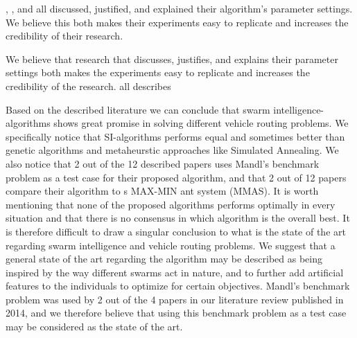 \citet{sedighpour14}, \citet{poorzahedy11}, and \citet{kechagiopoulos14} all discussed, justified, and explained their algorithm's parameter settings. We believe this both makes their experiments easy to replicate and increases the credibility of their research.

 We believe that research that discusses, justifies, and explains their parameter settings both makes the experiments easy to replicate and increases the credibility of the research. all describes



Based on the described literature we can conclude that swarm intelligence-algorithms shows great promise in solving different vehicle routing problems. We specifically notice that SI-algorithms performs equal and sometimes better than genetic algorithms and  metaheurstic approaches like Simulated Annealing. We also notice that 2 out of the 12 described papers uses Mandl's benchmark problem as a test case for their proposed algorithm, and that 2 out of 12 papers compare their algorithm to \citet{stutzle99}s MAX-MIN ant system (MMAS). It is worth mentioning that none of the proposed algorithms performs optimally in every situation and that there is no consensus in which algorithm is the overall best. It is therefore difficult to draw a singular conclusion to what is the state of the art regarding swarm intelligence and vehicle routing problems. We suggest that a general state of the art regarding the algorithm may be described as being inspired by the way different swarms act in nature, and to further add artificial features to the individuals to optimize for certain objectives. Mandl's benchmark problem was used by 2 out of the 4 papers in our literature review published in 2014, and we therefore believe that using this benchmark problem as a test case may be considered as the state of the art.



